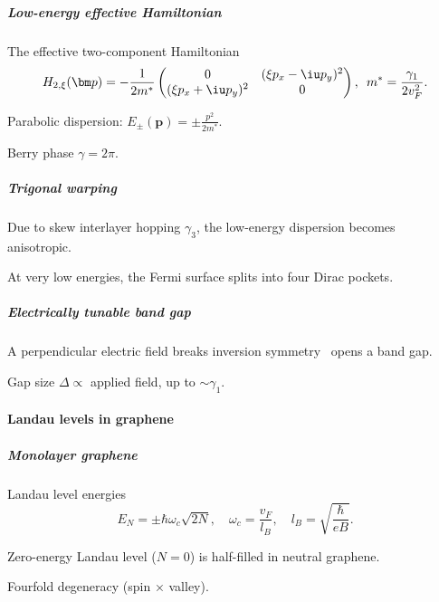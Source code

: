 \subparagraph{Low-energy effective Hamiltonian}\leavevmode

The effective two-component Hamiltonian
\[
  H_{2,\xi}(\bm p) = -\frac{1}{2m^*} \begin{pmatrix}
    0 & (\xi p_x - \iu p_y)^2\\
    (\xi p_x + \iu p_y)^2 & 0
  \end{pmatrix}, \enspace m^* = \frac{\gamma_1}{2v_F^2}.
\]
\begin{enumext}
  \item Parabolic dispersion: $E_{\pm}(\bm p) = \pm \frac{p^2}{2m^*}$.
  \item Berry phase $\gamma = 2\pi$.
\end{enumext}

\subparagraph{Trigonal warping}

\begin{enumext}
  \item Due to skew interlayer hopping $\gamma_3$, the low-energy dispersion
  becomes anisotropic.
  \item At very low energies, the Fermi surface splits into four Dirac pockets.
\end{enumext}

\subparagraph{Electrically tunable band gap}

\begin{enumext}
  \item A perpendicular electric field breaks inversion symmetry
  \textrightarrow\ opens a band gap.
  \item Gap size $\Delta \propto$ applied field, up to $\sim \gamma_1$.
\end{enumext}

\paragraph{Landau levels in graphene}

\subparagraph{Monolayer graphene}

\begin{enumext}
  \item Landau level energies
  \[
    E_N = \pm \hbar \omega_c \sqrt{2N}, \quad
    \omega_c = \frac{v_F}{l_B}, \quad
    l_B = \sqrt{\frac{\hbar}{eB}}.
  \]
  \item Zero-energy Landau level ($N=0$) is half-filled in neutral graphene.
  \item Fourfold degeneracy (spin × valley).
\end{enumext}

